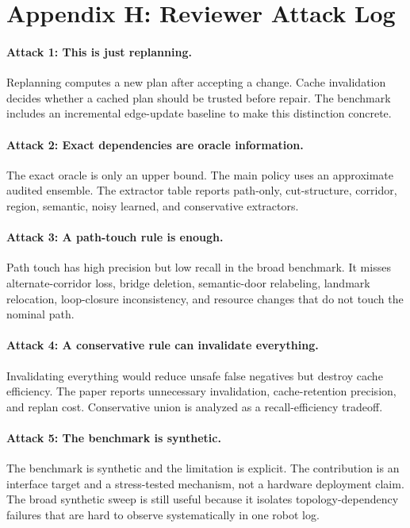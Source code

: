 \documentclass{article}
\begin{document}
\section{Appendix H: Reviewer Attack Log}

\paragraph{Attack 1: This is just replanning.}
Replanning computes a new plan after accepting a change. Cache invalidation decides whether a cached plan should be trusted before repair. The benchmark includes an incremental edge-update baseline to make this distinction concrete.

\paragraph{Attack 2: Exact dependencies are oracle information.}
The exact oracle is only an upper bound. The main policy uses an approximate audited ensemble. The extractor table reports path-only, cut-structure, corridor, region, semantic, noisy learned, and conservative extractors.

\paragraph{Attack 3: A path-touch rule is enough.}
Path touch has high precision but low recall in the broad benchmark. It misses alternate-corridor loss, bridge deletion, semantic-door relabeling, landmark relocation, loop-closure inconsistency, and resource changes that do not touch the nominal path.

\paragraph{Attack 4: A conservative rule can invalidate everything.}
Invalidating everything would reduce unsafe false negatives but destroy cache efficiency. The paper reports unnecessary invalidation, cache-retention precision, and replan cost. Conservative union is analyzed as a recall-efficiency tradeoff.

\paragraph{Attack 5: The benchmark is synthetic.}
The benchmark is synthetic and the limitation is explicit. The contribution is an interface target and a stress-tested mechanism, not a hardware deployment claim. The broad synthetic sweep is still useful because it isolates topology-dependency failures that are hard to observe systematically in one robot log.
\end{document}
